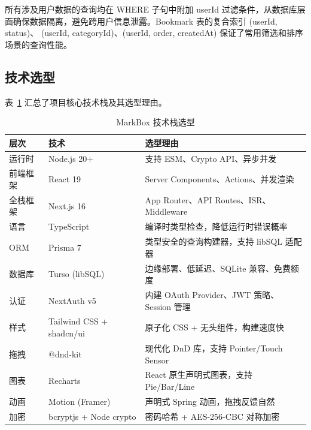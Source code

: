 \documentclass[a4paper,12pt]{ctexart}
\begin{document}
所有涉及用户数据的查询均在 WHERE 子句中附加 userId 过滤条件，从数据库层面确保数据隔离，避免跨用户信息泄露。Bookmark 表的复合索引 (userId, status)、 (userId, categoryId)、(userId, order, createdAt) 保证了常用筛选和排序场景的查询性能。


\subsection{技术选型}

表~\ref{tab:tech-stack} 汇总了项目核心技术栈及其选型理由。

\begin{table}[htbp]
\centering
\caption{MarkBox 技术栈选型}\label{tab:tech-stack}
\begin{tabular}{@{}lll@{}}
\toprule
\textbf{层次} & \textbf{技术} & \textbf{选型理由} \\
\midrule
运行时 & Node.js 20+ & 支持 ESM、Crypto API、异步并发 \\
前端框架 & React 19 & Server Components、Actions、并发渲染 \\
全栈框架 & Next.js 16 & App Router、API Routes、ISR、Middleware \\
语言 & TypeScript & 编译时类型检查，降低运行时错误概率 \\
ORM & Prisma 7 & 类型安全的查询构建器，支持 libSQL 适配器 \\
数据库 & Turso (libSQL) & 边缘部署、低延迟、SQLite 兼容、免费额度 \\
认证 & NextAuth v5 & 内建 OAuth Provider、JWT 策略、Session 管理 \\
样式 & Tailwind CSS + shadcn/ui & 原子化 CSS + 无头组件，构建速度快 \\
拖拽 & @dnd-kit & 现代化 DnD 库，支持 Pointer/Touch Sensor \\
图表 & Recharts & React 原生声明式图表，支持 Pie/Bar/Line \\
动画 & Motion (Framer) & 声明式 Spring 动画，拖拽反馈自然 \\
加密 & bcryptjs + Node crypto & 密码哈希 + AES-256-CBC 对称加密 \\
\bottomrule
\end{tabular}
\end{table}

\end{document}

